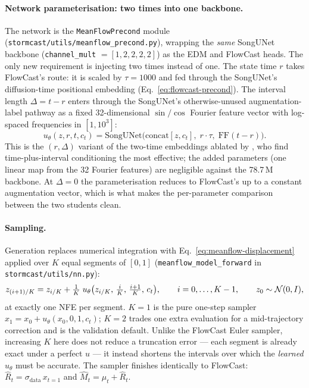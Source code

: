 \paragraph{Network parameterisation: two times into one backbone.} The network is the \texttt{MeanFlowPrecond} module (\texttt{stormcast/utils/meanflow\_precond.py}), wrapping the \emph{same} SongUNet backbone (\texttt{channel\_mult} $= [1, 2, 2, 2, 2]$) as the EDM and FlowCast heads. The only new requirement is injecting two times instead of one. The state time $r$ takes FlowCast's route: it is scaled by $\tau = 1000$ and fed through the SongUNet's diffusion-time positional embedding (Eq.~\eqref{eq:flowcast-precond}). The interval length $\Delta = t - r$ enters through the SongUNet's otherwise-unused augmentation-label pathway as a fixed 32-dimensional $\sin/\cos$ Fourier feature vector with log-spaced frequencies in $[1, 10^3]$:
\begin{equation}
  u_\theta(z, r, t, c_t) = \mathrm{SongUNet}\bigl(\mathrm{concat}[z, c_t],\; r \cdot \tau,\; \mathrm{FF}(t - r)\bigr).
  \label{eq:meanflow-precond}
\end{equation}
This is the $(r, \Delta)$ variant of the two-time embeddings ablated by \citet{geng2025meanflow}, who find time-plus-interval conditioning the most effective; the added parameters (one linear map from the 32 Fourier features) are negligible against the 78.7\,M backbone. At $\Delta = 0$ the parameterisation reduces to FlowCast's up to a constant augmentation vector, which is what makes the per-parameter comparison between the two students clean.

\paragraph{Sampling.} Generation replaces numerical integration with Eq.~\eqref{eq:meanflow-displacement} applied over $K$ equal segments of $[0, 1]$ (\texttt{meanflow\_model\_forward} in \texttt{stormcast/utils/nn.py}):
\begin{equation}
  z_{(i+1)/K} = z_{i/K} + \tfrac{1}{K}\; u_\theta\bigl(z_{i/K},\, \tfrac{i}{K},\, \tfrac{i+1}{K},\, c_t\bigr),
  \qquad i = 0, \ldots, K - 1,
  \qquad z_0 \sim \mathcal{N}(0, I),
  \label{eq:meanflow-sampler}
\end{equation}
at exactly one NFE per segment. $K = 1$ is the pure one-step sampler $\hat{x}_1 = x_0 + u_\theta(x_0, 0, 1, c_t)$; $K = 2$ trades one extra evaluation for a mid-trajectory correction and is the validation default. Unlike the FlowCast Euler sampler, increasing $K$ here does not reduce a truncation error --- each segment is already exact under a perfect $u$ --- it instead shortens the intervals over which the \emph{learned} $u_\theta$ must be accurate. The sampler finishes identically to FlowCast: $\hat{R}_t = \sigma_{\text{data}}\, x_{t=1}$ and $\hat{M}_t = \mu_t + \hat{R}_t$.

